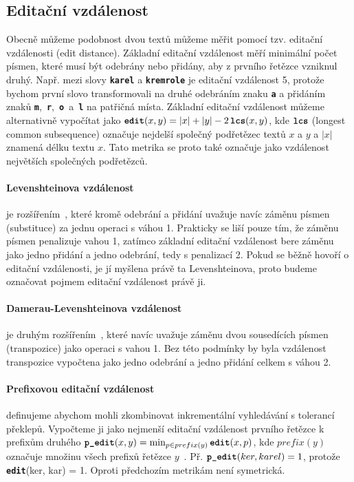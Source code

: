 \documentclass[11pt,letterpaper,oneside,openright]{book}
\newcommand{\bftt}[1]{\texttt{\textbf{#1}}}
\begin{document}
\subsection{Editační vzdálenost}
Obecně můžeme podobnost dvou textů můžeme měřit pomocí tzv. editační
vzdálenosti (edit distance). Základní editační vzdálenost měří minimální počet
písmen, které musí být odebrány nebo přidány, aby z prvního řetězce vzniknul
druhý. Např. mezi slovy \bftt{karel} a \bftt{kremrole} je editační vzdálenost
5, protože bychom první slovo transformovali na druhé odebráním znaku \bftt{a}
a přidáním znaků \bftt{m},~\bftt{r},~\bftt{o}~a~\bftt{l} na patřičná místa.
Základní editační vzdálenost můžeme alternativně vypočítat jako $\bftt{edit}(x,
y) = |x| + |y| - 2\,\bftt{lcs}(x, y)$, kde $\bftt{lcs}$ (longest common
subsequence) označuje nejdelší společný podřetězec textů $x$ a $y$ a $|x|$
znamená délku textu $x$.  Tato metrika se proto také označuje jako vzdálenost
největších společných podřetězců.

\paragraph{Levenshteinova vzdálenost} je rozšířením~\cite{Levenshtein66}, které
kromě odebrání a přidání uvažuje navíc záměnu písmen (substituce) za jednu
operaci s váhou 1.  Prakticky se liší pouze tím, že záměnu písmen penalizuje
vahou 1, zatímco základní editační vzdálenost bere záměnu jako jedno přidání a
jedno odebrání, tedy s penalizací 2. Pokud se běžně hovoří o editační
vzdálenosti, je jí myšlena právě ta Levenshteinova, proto budeme označovat
pojmem editační vzdálenost právě ji.

\paragraph{Damerau-Levenshteinova vzdálenost} je druhým
rozšířením~\cite{Damerau:1964:TCD:363958.363994}, které navíc uvažuje záměnu
dvou sousedících písmen (transpozice) jako operaci s vahou 1.  Bez této
podmínky by byla vzdálenost transpozice vypočtena jako jedno odebrání a jedno
přidání celkem s váhou 2.

\paragraph{Prefixovou editační vzdálenost} definujeme abychom mohli zkombinovat
inkrementální vyhledávání s tolerancí překlepů. Vypočteme ji jako nejmenší
editační vzdálenost prvního řetězce k prefixům druhého $\bftt{p\_edit}(x, y) =
\min_{p \in prefix(y)} \bftt{edit}(x, p)$, kde $prefix(y)$ označuje množinu
všech prefixů řetězce $y$~\cite{Bast:2013:EFS:2457465.2457470}. Př.
$\bftt{p\_edit}(ker, karel) = 1$, protože \bftt{edit}(ker, kar) = 1. Oproti
předchozím metrikám není symetrická. 
\end{document}
